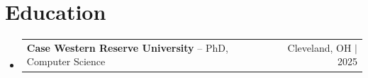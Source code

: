 \documentclass[letterpaper,13pt]{article}
\makeatletter
\newcommand{\resumeProjectHeading}[2]{
    \item
    \begin{tabular*}{\textwidth}{l@{\extracolsep{\fill}}r}
      \small#1 & #2 \\
    \end{tabular*}\vspace{-4pt}
}
\newcommand{\resumeSubHeadingListStart}{\begin{itemize}[leftmargin=0in, label={}]}
\newcommand{\resumeSubHeadingListEnd}{\end{itemize}}
\makeatother
\begin{document}
\section{Education}
\resumeSubHeadingListStart
  \resumeProjectHeading{\textbf{Case Western Reserve University} -- PhD, Computer Science}{Cleveland, OH $|$ 2025}
\resumeSubHeadingListEnd
\end{document}

